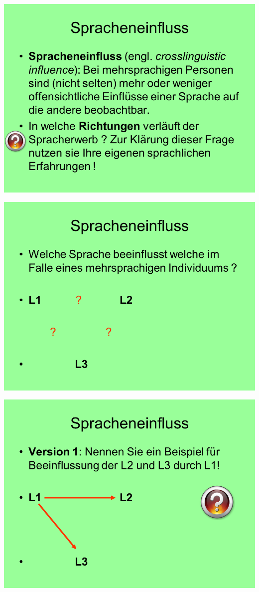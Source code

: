 \documentclass[
  letterpaper,
]{scrbook}
\begin{document}
\includegraphics[width=1\textwidth,height=\textheight]{./pictures/02_Spracheneinfluss_Sprachentrennung/Diapozitiv2.PNG}

\includegraphics[width=1\textwidth,height=\textheight]{./pictures/02_Spracheneinfluss_Sprachentrennung/Diapozitiv3.PNG}

\includegraphics[width=1\textwidth,height=\textheight]{./pictures/02_Spracheneinfluss_Sprachentrennung/Diapozitiv4.PNG}
\end{document}
